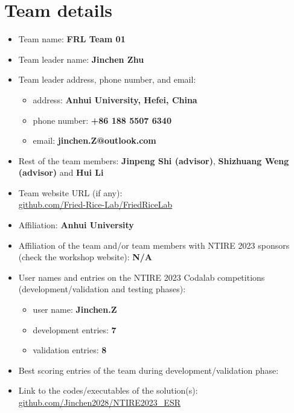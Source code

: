 \documentclass[10pt,twocolumn,letterpaper]{article}
\begin{document}
\section{Team details}

\newcommand{\github}[1]{\href{https://github.com/#1/}{github.com/#1}}

\begin{itemize}
	\item Team name: \textbf{FRL Team 01}                                  
	\item Team leader name: \textbf{Jinchen Zhu}                          
	\item Team leader address, phone number, and email:
	\begin{itemize}
		\item address: \textbf{Anhui University, Hefei, China}
		\item phone number: \textbf{+86 188 5507 6340}
		\item email: \textbf{jinchen.Z@outlook.com}
	\end{itemize}
	\item Rest of the team members: \textbf{Jinpeng Shi (advisor)}, \textbf{Shizhuang Weng (advisor)} and  \textbf{Hui Li}
	\item Team website URL (if any): \\ \github{Fried-Rice-Lab/FriedRiceLab}                   
	\item Affiliation: \textbf{Anhui University}
	\item Affiliation of the team and/or team members with NTIRE 2023 sponsors (check the workshop website): \textbf{N/A}
	\item User names and entries on the NTIRE 2023 Codalab competitions (development/validation and testing phases):
	\begin{itemize}
		\item user name: \textbf{Jinchen.Z}
		\item development entries: \textbf{7}
		\item validation entries: \textbf{8}
	\end{itemize}
	\item Best scoring entries of the team during development/validation phase:
	\begin{table}[h]
		\centering
	\end{table}
	\item Link to the codes/executables of the solution(s): \\ \github{Jinchen2028/NTIRE2023\_ESR}
\end{itemize}
\end{document}
